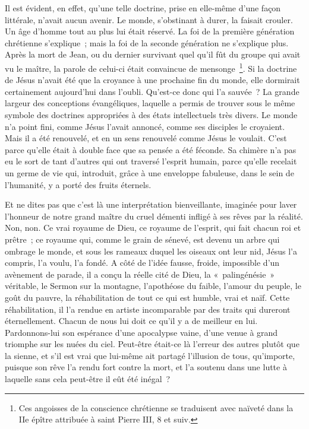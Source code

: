 \documentclass[french,twoside]{book} %
\begin{document}
Il est évident, en effet, qu’une telle doctrine, prise en elle-même d’une façon littérale, n’avait aucun avenir. Le monde, s’obstinant à durer, la faisait crouler. Un âge d’homme tout au plus lui était réservé. La foi de la première génération chrétienne s’explique ; mais la foi de la seconde génération ne s’explique plus. Après la mort de Jean, ou du dernier survivant quel qu’il fût du groupe qui avait vu le maître, la parole de celui-ci était convaincue de mensonge \footnote{Ces angoisses de la conscience chrétienne se traduisent avec naïveté dans la IIe épître attribuée à saint Pierre III, 8 et suiv.}. Si la doctrine de Jésus n’avait été que la croyance à une prochaine fin du monde, elle dormirait certainement aujourd’hui dans l’oubli. Qu’est-ce donc qui l’a sauvée ? La grande largeur des conceptions évangéliques, laquelle a permis de trouver sous le même symbole des doctrines appropriées à des états intellectuels très divers. Le monde n’a point fini, comme Jésus l’avait annoncé, comme ses disciples le croyaient. Mais il a été renouvelé, et en un sens renouvelé comme Jésus le voulait. C’est parce qu’elle était à double face que sa pensée a été féconde. Sa chimère n’a pas eu le sort de tant d’autres qui ont traversé l’esprit humain, parce qu’elle recelait un germe de vie qui, introduit, grâce à une enveloppe fabuleuse, dans le sein de l’humanité, y a porté des fruits éternels.\par
Et ne dites pas que c’est là une interprétation bienveillante, imaginée pour laver l’honneur de notre grand maître du cruel démenti infligé à ses rêves par la réalité. Non, non. Ce vrai royaume de Dieu, ce royaume de l’esprit, qui fait chacun roi et prêtre ; ce royaume qui, comme le grain de sénevé, est devenu un arbre qui ombrage le monde, et sous les rameaux duquel les oiseaux ont leur nid, Jésus l’a compris, l’a voulu, l’a fondé. A côté de l’idée fausse, froide, impossible d’un avènement de parade, il a conçu la réelle cité de Dieu, la « palingénésie » véritable, le Sermon sur la montagne, l’apothéose du faible, l’amour du peuple, le goût du pauvre, la réhabilitation de tout ce qui est humble, vrai et naïf. Cette réhabilitation, il l’a rendue en artiste incomparable par des traits qui dureront éternellement. Chacun de nous lui doit ce qu’il y a de meilleur en lui. Pardonnons-lui son espérance d’une apocalypse vaine, d’une venue à grand triomphe sur les nuées du ciel. Peut-être était-ce là l’erreur des autres plutôt que la sienne, et s’il est vrai que lui-même ait partagé l’illusion de tous, qu’importe, puisque son rêve l’a rendu fort contre la mort, et l’a soutenu dans une lutte à laquelle sans cela peut-être il eût été inégal ?\par
\end{document}

